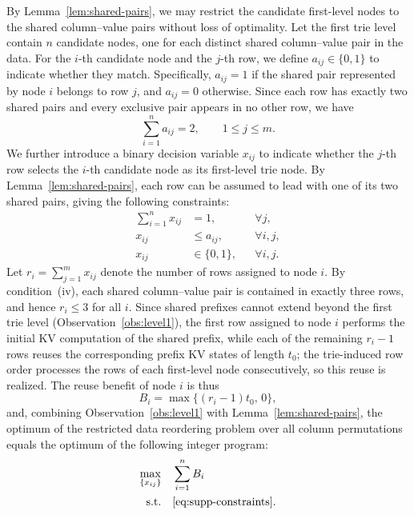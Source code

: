 By Lemma~\ref{lem:shared-pairs}, we may restrict the candidate first-level nodes to the shared column--value pairs without loss of optimality. Let the first trie level contain $n$ candidate nodes, one for each distinct shared column--value pair in the data. For the $i$-th candidate node and the $j$-th row, we define $a_{ij}\in\{0,1\}$ to indicate whether they match. Specifically, $a_{ij}=1$ if the shared pair represented by node $i$ belongs to row $j$, and $a_{ij}=0$ otherwise. Since each row has exactly two shared pairs and every exclusive pair appears in no other row, we have
\begin{equation}
\sum_{i=1}^{n}a_{ij}=2, \qquad 1\leq j\leq m.
\label{eq:supp-match}
\end{equation}
We further introduce a binary decision variable $x_{ij}$ to indicate whether the $j$-th row selects the $i$-th candidate node as its first-level trie node. By Lemma~\ref{lem:shared-pairs}, each row can be assumed to lead with one of its two shared pairs, giving the following constraints:
\begin{equation}
\begin{aligned}
\sum_{i=1}^{n}x_{ij} &= 1, && \forall j,\\
x_{ij} &\leq a_{ij}, && \forall i,j,\\
x_{ij} &\in\{0,1\}, && \forall i,j.
\end{aligned}
\label{eq:supp-constraints}
\end{equation}
Let $r_i=\sum_{j=1}^{m}x_{ij}$ denote the number of rows assigned to node $i$.
By condition~(iv), each shared column--value pair is contained in exactly three rows, and hence $r_i \leq 3$ for all $i$.
Since shared prefixes cannot extend beyond the first trie level (Observation~\ref{obs:level1}), the first row assigned to node $i$ performs the initial KV computation of the shared prefix, while each of the remaining $r_i-1$ rows reuses the corresponding prefix KV states of length $t_0$; the trie-induced row order processes the rows of each first-level node consecutively, so this reuse is realized. The reuse benefit of node $i$ is thus
\begin{equation}
B_i=\max\{(r_i-1)t_0,\,0\},
\end{equation}
and, combining Observation~\ref{obs:level1} with Lemma~\ref{lem:shared-pairs}, the optimum of the restricted data reordering problem over all column permutations equals the optimum of the following integer program:
\begin{equation}
\begin{aligned}
\max_{\{x_{ij}\}}\quad & \sum_{i=1}^{n}B_i\\
\mathrm{s.t.}\quad & \eqref{eq:supp-constraints}.
\end{aligned}
\label{eq:supp-restricted}
\end{equation}

